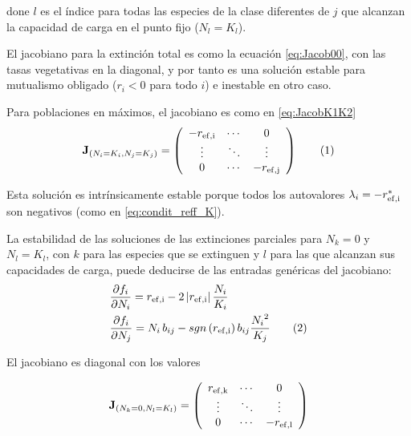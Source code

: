 \noindent done $l$ es el índice para todas las especies de la clase diferentes de $j$ que alcanzan la capacidad de carga en el punto fijo ($N_{l}=K_{l}$).

El jacobiano para la extinción total es como la ecuación \ref{eq:Jacob00}, con las tasas vegetativas en la diagonal, y por tanto es una solución estable para mutualismo obligado ($r_i<0$ para todo $i$) e inestable en otro caso.

Para poblaciones en máximos, el jacobiano es como en \ref{eq:JacobK1K2}
\begin{equation}
\displaystyle
\mathbf{J}_{\left(N_i=K_i, N_j=K_j\right)}= \left(
  \begin{array}{ccc}
    -r_{\rm{ef},i} & \cdots & 0\\
    \vdots & \ddots & \vdots \\
    0 & \cdots & -r_{\rm{ef},j}
    \end{array} \right)
\stepcounter{equation}\tag{\theequation}\label{eq:JacobK1K2}
\end{equation}

Esta solución es intrínsicamente estable porque todos los autovalores $\lambda_i=-r_{\rm{ef},i}^{\ast}$ son negativos (como en \ref{eq:condit_reff_K}).

La estabilidad de las soluciones de las extinciones parciales para $N_k=0$ y $N_l=K_l$, con
$k$ para las especies que se extinguen y $l$ para las que alcanzan sus capacidades de carga, puede deducirse de las entradas genéricas del jacobiano:
\begin{align*}
\displaystyle &\frac{\partial f_i}{\partial N_i} = r_{\rm{ef},i}-2\left|r_{\rm{ef},i}\right| \frac{N_i}{K_i}\\
\displaystyle &\frac{\partial f_i}{\partial N_j} = N_i\,b_{ij}-sgn\left(r_{\rm{ef},i}\right)b_{ij}\frac{{N_i}^2}{K_j}
\stepcounter{equation}\tag{\theequation}\label{eq:partial_ij}
\end{align*}

El jacobiano es diagonal con los valores

\begin{equation}
\displaystyle
\mathbf{J}_{\left(N_k=0,N_l=K_l\right)}= \left(
  \begin{array}{ccc}
    r_{\rm{ef},k} & \cdots & 0\\
    \vdots & \ddots & \vdots \\
    0 & \cdots & -r_{\rm{ef},l}
    \end{array} \right)
\label{eq:Jacob0_iK_j}
\end{equation}


